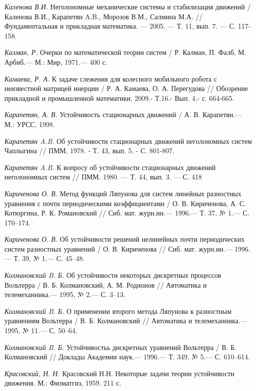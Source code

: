 \begin{thebibliography}{10}
	{\it Каленова В.И.} Неголономные механические системы и стабилизация движений / Каленова В.И., Карапетян A.B., Морозов В.М., Салмина М.А. // Фундаментальная и прикладная математика. — 2005. — Т. 11, вып. 7. — С. 117-158.
	
	{\it Калман, Р.} Очерки по математической теории систем / Р. Калман, П. Фалб, М. Арбиб.—
	М.: Мир, 1971.— 400 с.
	
	
	{\it Камаева, Р. А.} К задаче слежения для колесного мобильного робота с неизвестной матрицей инерции / Р. А. Камаева, О. А. Перегудова // Обозрение прикладной и промышленной математики. 2009.- Т.16.- Вып. 4.- с. 664-665.
	
	{\it Карапетян, А. В.} Устойчивость стационарных движений / А. В. Карапетян.—
	М.: УРСС, 1998.
	
	{\it Карапетян A.B.} Об устойчивости стационарных движений неголономных систем Чаплыгина // ПММ. 1978. - Т. 43, вып. 5. - С. 801-807.
	
	{\it Карапетян A.B.} К вопросу об устойчивости стационарных движений неголономных систем // ПММ. 1980. — Т. 44, вып. 3. — С. 418
	
	{\it Кириченова О. В.} Метод функций Ляпунова для систем линейных разностных уравнения с почти периодическими коэффициентами / О. В. Кириченова, А. С. Котюргина, Р. К. Романовский //
	Сиб. мат. журн.ин.— 1996.— Т. 37, № 1.— С. 170–174.
	
	{\it Кириченова О. В.} Об устойчивости решений нелинейных почти периодических систем разностных уравнений / О. В. Кириченова // Сиб. мат. журн.ин.— 1996.— Т. 39, № 1.— С. 45–48.
	
	{\it Колмановский B. Б.} Об устойчивости некоторых дискретных процессов Вольтерра / В. Б. Колмановский, А. М. Родионов // Автоматика и телемеханника.— 1995, № 2.— С. 3–13.
	
	{\it Колмановский B. Б.} О применении второго метода Ляпунова к разностным уравнениям Вольтерра / В. Б. Колмановский // Автоматика и телемеханника.— 1995, № 11.— С. 50–64.
	
	{\it Колмановский B. Б.} Устойчивостьь дискретных уравнений Вольтерра / В. Б. Колмановский // Доклады Академии наук.— 1996.— Т. 349, № 5.— С. 610–614.
	
	{\it Красовский, Н. Н.} Красовский Н.Н. Некоторые задачи теории устойчивости движения. М.:
	Физматгиз, 1959. 211 с.
	

\end{thebibliography}
